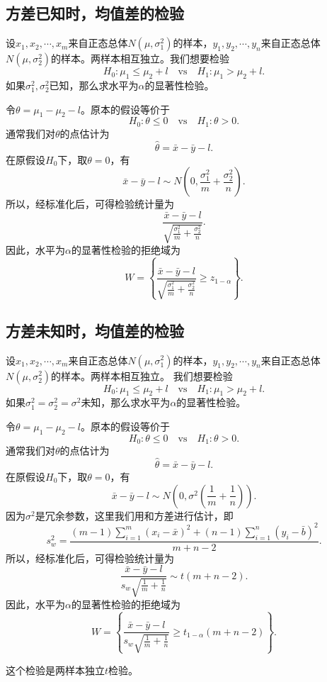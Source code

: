 \subsection{方差已知时，均值差的检验}
\begin{example}
    设$x_1,x_2,\cdots,x_m$来自正态总体$N(\mu,\sigma_1^2)$的样本，$y_1,y_2,\cdots,y_n$来自正态总体$N(\mu,\sigma_2^2)$的样本。两样本相互独立。我们想要检验
    $$
    H_0: \mu_1 \leq \mu_2 + l \quad \text{vs}\quad H_1: \mu_1 > \mu_2 + l.
    $$
    如果$\sigma_1^2,\sigma_2^2$已知，那么求水平为$\alpha$的显著性检验。
\end{example}
\begin{solution}
    令$\theta = \mu_1- \mu_2 -l$。原本的假设等价于
    $$
    H_0: \theta  \leq 0 \quad \text{vs}\quad H_1: \theta > 0.
    $$
    通常我们对$\theta$的点估计为
    $$
    \hat{\theta} = \bar{x} -\bar{y} -l.
    $$
    在原假设$H_0$下，取$\theta = 0$，有
    $$
   \bar{x} -\bar{y}-l \sim N\left(0,\frac{\sigma_1^2}{m} + \frac{\sigma_2^2}{n} \right) .
    $$
    所以，经标准化后，可得检验统计量为
    $$\frac{\bar{x} -\bar{y}-l}{\sqrt{\frac{\sigma_1^2}{m} + \frac{\sigma_2^2}{n}}}.$$
    因此，水平为$\alpha$的显著性检验的拒绝域为
    $$
    W = \left\{
    \frac{\bar{x} -\bar{y}-l}{\sqrt{\frac{\sigma_1^2}{m} + \frac{\sigma_2^2}{n}}} \geq z_{1-\alpha}
    \right\}.
    $$
\end{solution}
\subsection{方差未知时，均值差的检验}
\begin{example}
    设$x_1,x_2,\cdots,x_m$来自正态总体$N(\mu,\sigma_1^2)$的样本，$y_1,y_2,\cdots,y_n$来自正态总体$N(\mu,\sigma_2^2)$的样本。两样本相互独立。
    我们想要检验
    $$
    H_0: \mu_1 \leq \mu_2 + l \quad \text{vs}\quad H_1: \mu_1 > \mu_2 + l.
    $$
    如果$\sigma_1^2 = \sigma_2^2 =\sigma^2$未知，那么求水平为$\alpha$的显著性检验。
\end{example}
\begin{solution}
    令$\theta = \mu_1- \mu_2 -l$。原本的假设等价于
    $$
    H_0: \theta  \leq 0 \quad \text{vs}\quad H_1: \theta > 0.
    $$
    通常我们对$\theta$的点估计为
    $$
    \hat{\theta} = \bar{x} -\bar{y} -l.
    $$
    在原假设$H_0$下，取$\theta = 0$，有
    $$
   \bar{x} -\bar{y}-l \sim N\left(0,\sigma^2\left(\frac{1}{m} + \frac{1}{n} \right)\right) .
    $$
    因为$\sigma^2$是冗余参数，这里我们用和方差进行估计，即
    $$
    s_w^2 = \frac{(m-1)\sum_{i=1}^m (x_i -\bar{x})^2 +(n-1)\sum_{i=1}^n (y_i -\bar{b})^2 }{m+n-2}.
    $$
    所以，经标准化后，可得检验统计量为
    $$\frac{\bar{x} -\bar{y}-l}{s_w\sqrt{\frac{1}{m} + \frac{1}{n}}} \sim t(m+n-2).$$
    因此，水平为$\alpha$的显著性检验的拒绝域为
    $$
    W = \left\{
    \frac{\bar{x} -\bar{y}-l}{s_w\sqrt{\frac{1}{m} + \frac{1}{n}}} \geq t_{1-\alpha}(m+n-2)
    \right\}.
    $$
\end{solution}
\begin{remark}
    这个检验是两样本独立$t$检验。
\end{remark}
